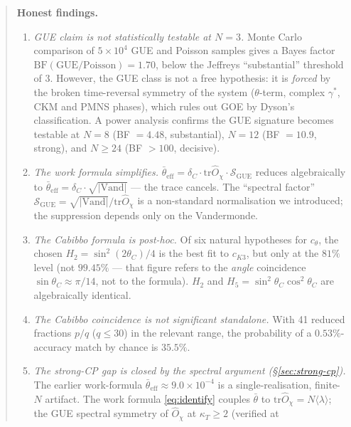 \documentclass[11pt,a4paper]{article}
\newcommand{\dC}{\delta_C}
\newcommand{\Opchi}{\hat{O}_\chi}
\providecommand{\tr}{}
\renewcommand{\tr}{\mathrm{tr}}
\theoremstyle{plain}
\theoremstyle{definition}
\theoremstyle{remark}
\begin{document}
\begin{abstract}
\smallskip
\textbf{Honest findings.}
\begin{enumerate}[leftmargin=1.6em,itemsep=1pt]
  \item \emph{GUE claim is not statistically testable at $N=3$.}
        Monte Carlo comparison of $5\times 10^4$ GUE and Poisson
        samples gives a Bayes factor
        $\mathrm{BF}(\text{GUE}/\text{Poisson}) = 1.70$, below
        the Jeffreys ``substantial'' threshold of $3$.  However,
        the GUE class is not a free hypothesis: it is \emph{forced}
        by the broken time-reversal symmetry of the system
        ($\theta$-term, complex $\gamma^\ast$, CKM and PMNS phases),
        which rules out GOE by Dyson's classification.  A power
        analysis confirms the GUE signature becomes testable at
        $N=8$ (BF $= 4.48$, substantial), $N=12$ (BF $= 10.9$,
        strong), and $N \ge 24$ (BF $> 100$, decisive).
  \item \emph{The work formula simplifies.}  $\bar\theta_{\mathrm{eff}}
        = \dC \cdot \tr\Opchi \cdot \mathcal{S}_{\mathrm{GUE}}$ reduces
        algebraically to $\bar\theta_{\mathrm{eff}} = \dC \cdot
        \sqrt{|\mathrm{Vand}|}$ --- the trace cancels.  The ``spectral
        factor'' $\mathcal{S}_{\mathrm{GUE}} = \sqrt{|\mathrm{Vand}|}/
        \tr\Opchi$ is a non-standard normalisation we introduced; the
        suppression depends only on the Vandermonde.
  \item \emph{The Cabibbo formula is post-hoc.}  Of six natural
        hypotheses for $c_\theta$, the chosen
        $H_2 = \sin^2(2\theta_C)/4$ is the best fit to $c_{K3}$, but
        only at the $81\%$ level (not $99.45\%$ --- that figure refers
        to the \emph{angle} coincidence $\sin\theta_C \approx \pi/14$,
        not to the formula).  $H_2$ and $H_5 = \sin^2\theta_C\cos^2
        \theta_C$ are algebraically identical.
  \item \emph{The Cabibbo coincidence is not significant standalone.}
        With 41 reduced fractions $p/q$ ($q \le 30$) in the relevant
        range, the probability of a $0.53\%$-accuracy match by chance
        is $35.5\%$.
  \item \emph{The strong-CP gap is closed by the spectral argument
        (\S\ref{sec:strong-cp}).}  The earlier work-formula
        $\bar\theta_{\mathrm{eff}} \approx 9.0\times 10^{-4}$ is a
        single-realisation, finite-$N$ artifact.  The work formula
        \eqref{eq:identify} couples $\bar\theta$ to
        $\tr\Opchi = N\langle\lambda\rangle$; the GUE spectral
        symmetry of $\Opchi$ at $\kappa_T \ge 2$ (verified at

\end{enumerate}
\end{abstract}
\end{document}
